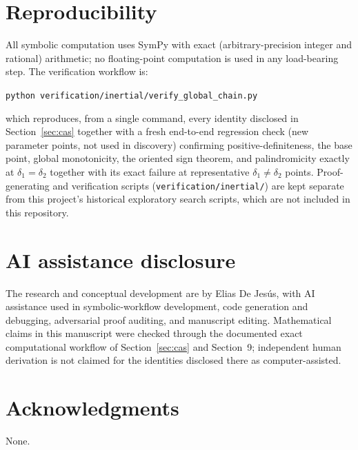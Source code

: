 \documentclass[11pt]{article}
\theoremstyle{definition}
\begin{document}
\section{Reproducibility}

All symbolic computation uses SymPy with exact (arbitrary-precision
integer and rational) arithmetic; no floating-point computation is used
in any load-bearing step. The verification workflow is:
\begin{center}
\texttt{python verification/inertial/verify\_global\_chain.py}
\end{center}
which reproduces, from a single command, every identity disclosed in
Section~\ref{sec:cas} together with a fresh end-to-end regression check
(new parameter points, not used in discovery) confirming
positive-definiteness, the base point, global monotonicity, the oriented
sign theorem, and palindromicity exactly at $\delta_1=\delta_2$ together
with its exact failure at representative $\delta_1\neq\delta_2$ points.
Proof-generating and verification scripts (\texttt{verification/inertial/})
are kept separate from this project's historical exploratory search
scripts, which are not included in this repository.

\section*{AI assistance disclosure}

The research and conceptual development are by Elias De Jes\'us, with AI
assistance used in symbolic-workflow development, code generation and
debugging, adversarial proof auditing, and manuscript editing.
Mathematical claims in this manuscript were checked through the
documented exact computational workflow of Section~\ref{sec:cas} and
Section~9; independent human derivation is not claimed for the
identities disclosed there as computer-assisted.

\section*{Acknowledgments}

None.



\end{document}
